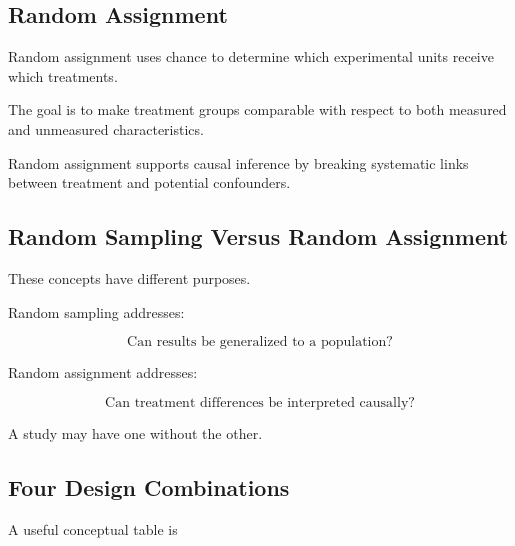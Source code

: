 \subsection{Random Assignment}
\label{subsec:random-assignment}

Random assignment uses chance to determine which experimental units
receive which treatments.

The goal is to make treatment groups comparable with respect to both
measured and unmeasured characteristics.

Random assignment supports causal inference by breaking systematic links
between treatment and potential confounders.

\subsection{Random Sampling Versus Random Assignment}
\label{subsec:random-sampling-versus-assignment}

These concepts have different purposes.

Random sampling addresses:

\[
\boxed{
\text{Can results be generalized to a population?}
}
\]

Random assignment addresses:

\[
\boxed{
\text{Can treatment differences be interpreted causally?}
}
\]

A study may have one without the other.

\subsection{Four Design Combinations}
\label{subsec:four-randomization-combinations}

A useful conceptual table is

